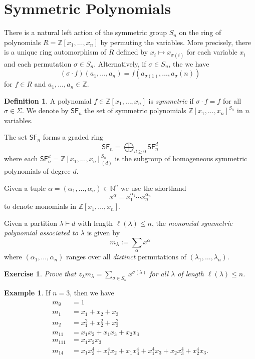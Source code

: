 \documentclass[12pt]{article}
\theoremstyle{plain}
\newtheorem{exercise}[theorem]{Exercise}
\theoremstyle{definition}
\newtheorem{definition}[theorem]{Definition}
\newtheorem{example}[theorem]{Example}
\theoremstyle{remark}
\numberwithin{equation}{section}
\begin{document}
\section{Symmetric Polynomials}

There is a natural left action of the symmetric group $S_n$ on the ring of
polynomials $R=\mathbb{Z}[x_1,\ldots,x_n]$ by permuting the variables.
More precisely, there is a unique ring automorphism of $R$ defined
by $x_i \mapsto x_{\sigma(i)}$ for each variable $x_i$ and each
permutation $\sigma \in S_n$.
Alternatively, if $\sigma \in S_n$, the we have
\[
(\sigma \cdot f)(a_1,\ldots,a_n) =
f\left(a_{\sigma(1)}, \ldots, a_{\sigma}(n)\right)
\]
for $f \in R$ and $a_1,\ldots,a_n \in \mathbb{Z}$.

\begin{definition}
A polynomial $f \in \mathbb{Z}[x_1,\ldots, x_n]$ is \emph{symmetric}
if $\sigma \cdot f = f$ for all $\sigma \in \Sigma$.
We denote by $\mathsf{SF}_n$ the set of symmetric polynomials
$\mathbb{Z}[x_1,\ldots,x_n]^{S_n}$ in $n$ variables.
\end{definition}

The set $\mathsf{SF}_n$ forms a graded ring
\[
\mathsf{SF}_n = \bigoplus_{d \ge 0} \mathsf{SF}_n^d
\]
where each $\mathsf{SF}_n^d = \mathbb{Z}[x_1,\ldots,x_n]_{(d)}^{S_n}$
is the subgroup of homogeneous symmetric polynomials of degree $d$.

Given a tuple $\alpha = (\alpha_1,\ldots,\alpha_n) \in \mathbb{N}^n$
we use the shorthand
\[
x^\alpha = x_1^{\alpha_1} \cdots x_n^{\alpha_n}
\]
to denote monomials in $\mathbb{Z}[x_1,\ldots,x_n]$.

Given a partition $\lambda \vdash d$ with length $\ell(\lambda) \le n$,
the \emph{monomial symmetric polynomial associated to $\lambda$}
is given by
\[
m_\lambda := \sum_{\alpha} x^\alpha
\]
where $(\alpha_1,\ldots,\alpha_n)$ ranges over all
\emph{distinct} permutations of $(\lambda_1,\ldots,\lambda_n)$.

\begin{exercise}
Prove that $\displaystyle z_\lambda m_\lambda = \sum_{\sigma \in S_n}
x^{\sigma(\lambda)}$ for all $\lambda$ of length $\ell(\lambda) \le n$.
\end{exercise}

\begin{example}
If $n=3$, then we have
\begin{align*}
m_\emptyset &= 1\\
m_1 &= x_1 + x_2 + x_3\\
m_2 &= x_1^2 + x_2^2 + x_3^2\\
m_{11} &= x_1x_2 + x_1x_3 + x_2x_3\\
m_{111} &= x_1x_2x_3 \\
m_{14} &= x_1x_2^4 + x_1^4x_2 + x_1x_3^4 + x_1^4x_3 + x_2x_3^4 +
x_2^4x_3.
\end{align*}
\end{example}
\end{document}
